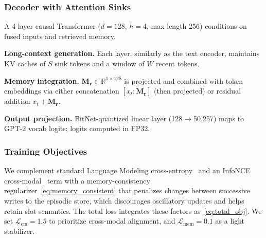 


\subsubsection{Decoder with Attention Sinks}
A 4-layer causal Transformer ($d{=}128$, $h{=}4$, max length 256) conditions on fused inputs and retrieved memory.

\textbf{Long-context generation.} Each layer, similarly as the text encoder, maintains KV caches of $S$ sink tokens and a window of $W$ recent tokens.

\textbf{Memory integration.} $\mathbf{M_r}\in\mathbb{R}^{1\times128}$ is projected and combined with token embeddings via either concatenation $[x_t;\mathbf{M_r}]$ (then projected) or residual addition $x_t{+}\mathbf{M_r}$.

\textbf{Output projection.} BitNet-quantized linear layer (128$\rightarrow$50{,}257) maps to GPT-2 vocab logits; logits computed in FP32.

\subsubsection{Training Objectives}
We complement standard Language Modeling cross-entropy~\citep{vaswani2017attention} and an InfoNCE cross-modal~\citep{oord_representation_2018} term with a memory-consistency regularizer~\autoref{eq:memory_consistent} that penalizes changes between successive writes to the episodic store, which discourages oscillatory updates and helps retain slot semantics. The total loss integrates these factors as~\autoref{eq:total_obj}. We set $\mathcal{L}_{\text{cm}}=1.5$ to prioritize cross-modal alignment, and $\mathcal{L}_{\text{mem}}=0.1$ as a light stabilizer.

